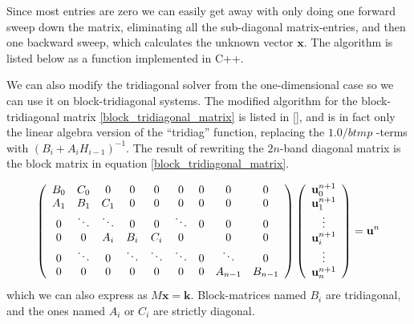 Since most entries are zero we can easily get away with only doing one forward sweep down the matrix, eliminating all the sub-diagonal matrix-entries, and then one backward sweep, which calculates the unknown vector $\mathbf{x}$. The algorithm is listed below as a function implemented in C++.


We can also modify the tridiagonal solver from the one-dimensional case so we can use it on block-tridiagonal systems. 
The modified algorithm for the block-tridiagonal matrix \ref{block_tridiagonal_matrix} is listed in \ref{}, and is in fact only the linear algebra version of the ``tridiag'' function, replacing the $1.0/btmp$ -terms with $\left(B_i+A_iH_{i-1}\right)^{-1}$. The result of rewriting the $2n$-band diagonal matrix is the block matrix in equation \ref{block_tridiagonal_matrix}.

\begin{align}\label{block_tridiagonal_matrix}
   \left(\begin{array}{c c c c c c c c c}
        B_0 & C_0 &0 &0 &0 &0 &0 &0 &0\\
        A_1 & B_1 & C_1 &0 &0 &0 &0 &0 &0\\
        0&\ddots & \ddots & 0 & 0 & \ddots &0&0&0\\
        0 & 0&A_i & B_i & C_i& 0 &  &0&0\\
        0& \ddots&0&\ddots & \ddots & \ddots & 0 & \ddots &0\\
         0&0 &0 &0&0 &0&0&A_{n-1} & B_{n-1}
       \end{array}\right) \left(\begin{array}{c}
             \mathbf{u}^{n+1}_{0}\\
             \mathbf{u}^{n+1}_{1}\\
             \vdots\\
             \mathbf{u}^{n+1}_{i}\\
             \vdots\\
             \mathbf{u}^{n+1}_{n}
             \end{array}\right) = \mathbf{u}^{n}
\end{align}
which we can also express as $M\mathbf{x} = \mathbf{k}$. Block-matrices named $B_i$ are tridiagonal, and the ones named $A_i$ or $C_i$ are strictly diagonal. 

